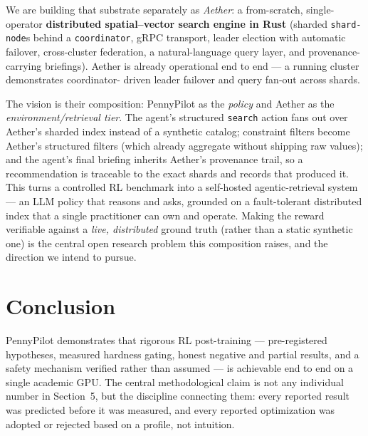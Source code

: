 \documentclass[11pt]{article}
\begin{document}
We are building that substrate separately as \emph{Aether}: a from-scratch,
single-operator \textbf{distributed spatial--vector search engine in Rust}
(sharded \texttt{shard-node}s behind a \texttt{coordinator}, gRPC transport,
leader election with automatic failover, cross-cluster federation, a
natural-language query layer, and provenance-carrying briefings). Aether is
already operational end to end --- a running cluster demonstrates coordinator-
driven leader failover and query fan-out across shards.

The vision is their composition: PennyPilot as the \emph{policy} and Aether as
the \emph{environment/retrieval tier}. The agent's structured \texttt{search}
action fans out over Aether's sharded index instead of a synthetic catalog;
constraint filters become Aether's structured filters (which already aggregate
without shipping raw values); and the agent's final briefing inherits Aether's
provenance trail, so a recommendation is traceable to the exact shards and
records that produced it. This turns a controlled RL benchmark into a
self-hosted agentic-retrieval system --- an LLM policy that reasons and asks,
grounded on a fault-tolerant distributed index that a single practitioner can
own and operate. Making the reward verifiable against a \emph{live, distributed}
ground truth (rather than a static synthetic one) is the central open research
problem this composition raises, and the direction we intend to pursue.

\section{Conclusion}
PennyPilot demonstrates that rigorous RL post-training --- pre-registered
hypotheses, measured hardness gating, honest negative and partial results, and a
safety mechanism verified rather than assumed --- is achievable end to end on a
single academic GPU. The central methodological claim is not any individual
number in Section~5, but the discipline connecting them: every reported result
was predicted before it was measured, and every reported optimization was adopted
or rejected based on a profile, not intuition.
\end{document}
